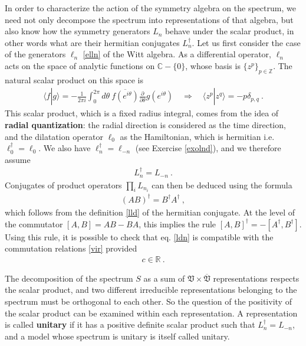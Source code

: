 \documentclass[12pt, a4paper, notitlepage, twoside]{report}
\numberwithin{equation}{section}
\theoremstyle{break}
\begin{document}
In order to characterize the action of the symmetry algebra on the spectrum, we need not only decompose the spectrum into representations of that algebra, but also know how the symmetry generators $L_n$ behave under the scalar product, in other words what are their hermitian conjugates $L_n^\dagger$.
Let us first consider the case of the generators $\ell_n$ \eqref{elln} of the Witt algebra.  
As a differential operator, $\ell_n$ acts on the space of analytic functions on ${\mathbb{C}}-\{0\}$, whose basis is $\{z^p\}_{p\in{\mathbb{Z}}}$.
The natural scalar product on this space is 
\begin{align}
 \langle f|g\rangle = -\frac{1}{2\pi i}\int_0^{2\pi}d\theta\  \overline{f(e^{i\theta})} {\frac{\partial}{\partial \theta}} g(e^{i\theta}) \quad \Rightarrow \quad \langle z^p| z^q \rangle = -p\delta_{p,q}\ .
\label{fgd}
\end{align}
This scalar product, which is a fixed radius integral, comes from the idea of \textbf{\boldmath radial quantization}: the radial direction is considered as the time direction, and the dilatation operator $\ell_0$ as the Hamiltonian, which is hermitian i.e. $\ell_0^\dagger = \ell_0$.
We also have $\ell_n^\dagger = \ell_{-n}$ (see Exercise \ref{exolnd}), and we therefore assume
\begin{align}
 \boxed{L^\dagger_n = L_{-n}} \ .
\label{ldn}
\end{align}
Conjugates of product operators $\prod_i L_{n_i}$ can then be deduced using the formula
\begin{align}
 (AB)^\dagger = B^\dagger A^\dagger\ , 
\label{abba}
\end{align}
which follows from the definition \eqref{lld} of the hermitian conjugate.
At the level of the commutator $[A,B]=AB-BA$, this implies
the rule $[A,B]^\dagger = -[A^\dagger,B^\dagger]$. 
Using this rule, it is possible to check that eq. \eqref{ldn} is compatible with the commutation relations \eqref{vir} provided
\begin{align}
 c\in {\mathbb{R}}\ .
\label{cir}
\end{align}

The decomposition of the spectrum $S$ as a sum of $\mathfrak{V}\times \overline{\mathfrak{V}}$ representations respects the scalar product, and two different irreducible representations belonging to the spectrum must be orthogonal to each other.
So the question of the positivity of the scalar product can be examined within each representation.
A representation is called \textbf{\boldmath unitary} if it has a positive definite scalar product such that 
$L^\dagger_n = L_{-n}$, and a model whose spectrum is unitary is itself called unitary. 
\end{document}
